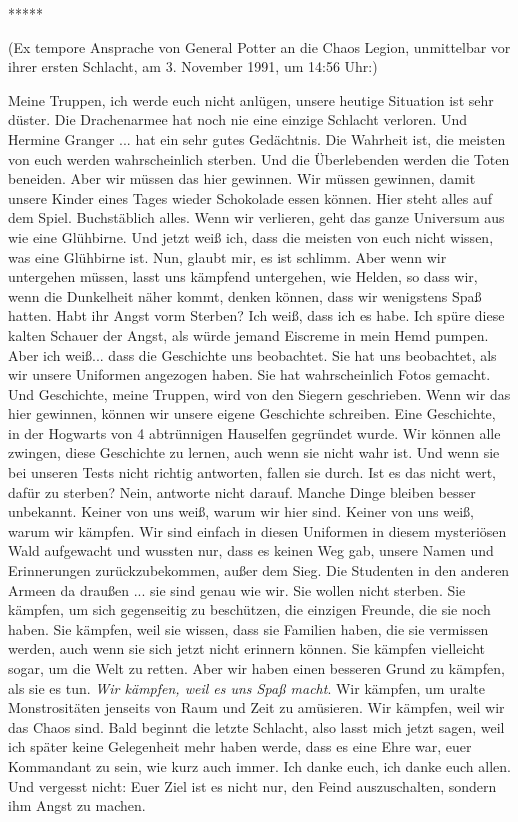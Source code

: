 \begin{center}*****\end{center}

(Ex tempore Ansprache von General Potter an die Chaos Legion, unmittelbar vor
ihrer ersten Schlacht, am 3. November 1991, um 14:56 Uhr:)

Meine Truppen, ich werde euch nicht anlügen, unsere heutige Situation ist sehr
düster. Die Drachenarmee hat noch nie eine einzige Schlacht verloren. Und
Hermine Granger ... hat ein sehr gutes Gedächtnis. Die Wahrheit ist, die meisten
von euch werden wahrscheinlich sterben. Und die Überlebenden werden die Toten
beneiden. Aber wir müssen das hier gewinnen. Wir müssen gewinnen, damit unsere
Kinder eines Tages wieder Schokolade essen können. Hier steht alles auf dem
Spiel. Buchstäblich alles. Wenn wir verlieren, geht das ganze Universum aus wie
eine Glühbirne. Und jetzt weiß ich, dass die meisten von euch nicht wissen, was
eine Glühbirne ist. Nun, glaubt mir, es ist schlimm. Aber wenn wir untergehen
müssen, lasst uns kämpfend untergehen, wie Helden, so dass wir, wenn die
Dunkelheit näher kommt, denken können, dass wir wenigstens Spaß hatten. Habt ihr
Angst vorm Sterben? Ich weiß, dass ich es habe. Ich spüre diese kalten Schauer
der Angst, als würde jemand Eiscreme in mein Hemd pumpen. Aber ich weiß... dass
die Geschichte uns beobachtet. Sie hat uns beobachtet, als wir unsere Uniformen
angezogen haben. Sie hat wahrscheinlich Fotos gemacht. Und Geschichte, meine
Truppen, wird von den Siegern geschrieben. Wenn wir das hier gewinnen, können
wir unsere eigene Geschichte schreiben. Eine Geschichte, in der Hogwarts von 4
abtrünnigen Hauselfen gegründet wurde. Wir können alle zwingen, diese Geschichte
zu lernen, auch wenn sie nicht wahr ist. Und wenn sie bei unseren Tests nicht
richtig antworten, fallen sie durch. Ist es das nicht wert, dafür zu sterben?
Nein, antworte nicht darauf. Manche Dinge bleiben besser unbekannt. Keiner von
uns weiß, warum wir hier sind. Keiner von uns weiß, warum wir kämpfen. Wir sind
einfach in diesen Uniformen in diesem mysteriösen Wald aufgewacht und wussten
nur, dass es keinen Weg gab, unsere Namen und Erinnerungen zurückzubekommen,
außer dem Sieg. Die Studenten in den anderen Armeen da draußen ... sie sind genau
wie wir. Sie wollen nicht sterben. Sie kämpfen, um sich gegenseitig zu
beschützen, die einzigen Freunde, die sie noch haben. Sie kämpfen, weil sie
wissen, dass sie Familien haben, die sie vermissen werden, auch wenn sie sich
jetzt nicht erinnern können. Sie kämpfen vielleicht sogar, um die Welt zu
retten. Aber wir haben einen besseren Grund zu kämpfen, als sie es tun.
\emph{Wir kämpfen, weil es uns Spaß macht}. Wir kämpfen, um uralte
Monstrositäten jenseits von Raum und Zeit zu amüsieren. Wir kämpfen, weil wir
das Chaos sind. Bald beginnt die letzte Schlacht, also lasst mich jetzt sagen,
weil ich später keine Gelegenheit mehr haben werde, dass es eine Ehre war, euer
Kommandant zu sein, wie kurz auch immer. Ich danke euch, ich danke euch allen.
Und vergesst nicht: Euer Ziel ist es nicht nur, den Feind auszuschalten, sondern
ihm Angst zu machen.\grqq{}

